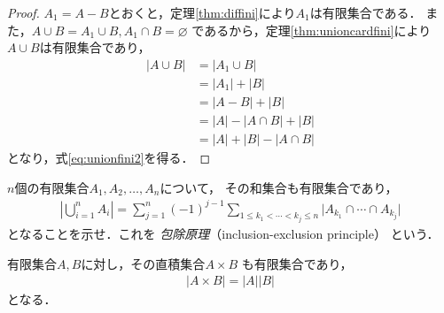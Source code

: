    \begin{proof}
     $A_1 = A-B$とおくと，定理\ref{thm:diffini}により$A_1$は有限集合である．
     また，$A \cup B = A_1 \cup B ,  A_1 \cap B = \varnothing$
     であるから，定理\ref{thm:unioncardfini}により$A \cup B$は有限集合であり，
     \begin{align*}
       \lvert A \cup B \rvert 
       & = \lvert A_1 \cup B \rvert \\
       & = \lvert A_1 \rvert + \lvert B \rvert \\
       & = \lvert A-B \rvert + \lvert B \rvert \\
       & = \lvert A \rvert - \lvert A \cap B \rvert + \lvert B \rvert \\
       & = \lvert A \rvert + \lvert B \rvert - \lvert A \cap B \rvert
     \end{align*}
     となり，式\eqref{eq:unionfini2}を得る．
   \end{proof}

   \begin{que} \label{que:houjogenri}
     $n$個の有限集合$A_1, A_2, \ldots , A_n$について，
     その和集合も有限集合であり，
     \begin{align}
       \left \lvert \bigcup_{i=1}^{n} A_i \right \rvert =
       \sum_{j=1}^{n} (-1)^{j-1} \sum_{1 \leq k_1 < \cdots < k_j \leq n}
       \lvert A_{k_1} \cap \cdots \cap A_{k_j} \rvert
       \label{eq:houjogenri}
     \end{align}
     となることを示せ．これを
     \emph{包除原理}（inclusion-exclusion principle）
     という．
   \end{que}


      \begin{thm} \label{thm:tyokusekifini}
     有限集合$A, B$に対し，その直積集合$A \times B$
     も有限集合であり，
     \begin{align}
       \lvert A \times B \rvert = \lvert A \rvert \lvert B \rvert 
       \label{eq:tyokusekifini}
     \end{align}
     となる．
   \end{thm}

